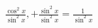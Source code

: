 \documentclass[preview]{standalone}
\begin{document}
\begin{align*}
\frac{\cos^2x}{\sin^2x},+ \frac{\sin^2x}{\sin^2x} = \frac{1}{\sin^2x}
\end{align*}
\end{document}
